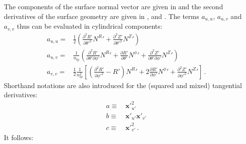 The components of the surface normal vector are given in 
and the second derivatives of the surface geometry are given in ,  and .
The terms $a_{u,u}$, $a_{u,v}$ and $a_{v,v}$ thus can be evaluated in cylindrical components:
\begin{align}
  a_{u,u} =& \frac{1}{2}
               \left(  \frac{\partial^2 R'}{\partial {\theta'}^2} {N^R}'
                     + \frac{\partial^2 Z'}{\partial {\theta'}^2} {N^Z}' \right) \label{eqn:auu} \\
  a_{u,v} =& \frac{1}{n_\mathrm{fp}}
               \left(  \frac{\partial^2 R'}{\partial \theta' \partial \phi'} {N^R}'
                     + \frac{\partial   R'}{\partial \theta'               } {N^\phi}'
                     + \frac{\partial^2 Z'}{\partial \theta' \partial \phi'} {N^Z}'      \right) \label{eqn:auv} \\
  a_{v,v} =& \frac{1}{2} \frac{1}{n_\mathrm{fp}^2}
               \left[  \left( \frac{\partial^2 R'}{\partial {\phi'}^2} - R' \right) {N^R}'
                     + 2      \frac{\partial   R'}{\partial \phi'  }                {N^\phi}'
                     +        \frac{\partial^2 Z'}{\partial {\phi'}^2}              {N^Z}'    \right] \label{eqn:avv} \, .
\end{align}
Shorthand notations are also introduced for the (squared and mixed) tangential derivatives:
\begin{align}
  a \equiv&\, {\mathbf{x}'}^2_{u'} \nonumber \\
  b \equiv&\,  \mathbf{x}'_{u'} \mathbf{x}'_{v'} \label{eqn:def_abc} \\
  c \equiv&\, {\mathbf{x}'}^2_{v'} \nonumber \, .
\end{align}
It follows:
